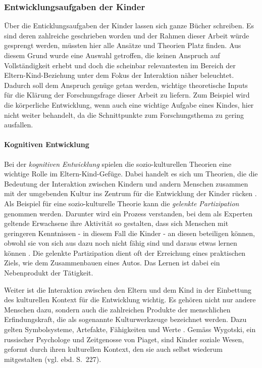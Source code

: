 \subsubsection{Entwicklungsaufgaben der Kinder}\label{sec:Entwicklungsaufgaben} Über die Enticklungsaufgaben der Kinder lassen sich ganze Bücher schreiben. Es sind deren zahlreiche geschrieben worden und der Rahmen dieser Arbeit würde gesprengt werden, müssten hier alle Ansätze und Theorien Platz finden. Aus diesem Grund wurde eine Auswahl getroffen, die keinen Anspruch auf Vollständigkeit erhebt und doch die scheinbar relevantesten im Bereich der Eltern-Kind-Beziehung unter dem Fokus der Interaktion näher beleuchtet. Dadurch soll dem Anspruch genüge getan werden, wichtige theoretische Inputs für die Klärung der Forschungsfrage dieser Arbeit zu liefern. Zum Beispiel wird die körperliche Entwicklung, wenn auch eine wichtige Aufgabe eines Kindes, hier nicht weiter behandelt, da die Schnittpunkte zum Forschungsthema zu gering ausfallen.

\paragraph{Kognitiven Entwicklung}\label{par:KognitiveEntwicklung}
Bei der \textit{kognitiven Entwicklung} spielen die sozio-kulturellen Theorien eine wichtige Rolle im Eltern-Kind-Gefüge. Dabei handelt es sich um Theorien, die die Bedeutung der Interaktion zwischen Kindern und andern Menschen zusammen mit der umgebenden Kultur ins Zentrum für die Entwicklung der Kinder rücken \cite[S.~225ff]{Siegler2008}. Als Beispiel für eine sozio-kulturelle Theorie kann die \textit{gelenkte Partizipation} genommen werden. Darunter wird ein Prozess verstanden, bei dem als Experten geltende Erwachsene ihre Aktivität so gestalten, dass sich Menschen mit geringeren Kenntnissen - in diesem Fall die Kinder - an diesen beteiligen können, obwohl sie von sich aus dazu noch nicht fähig sind und daraus etwas lernen können \cite{Rogoff1990}. Die gelenkte Partizipation dient oft der Erreichung eines praktischen Ziels, wie dem Zusammenbauen eines Autos. Das Lernen ist dabei ein Nebenprodukt der Tätigkeit.

Weiter ist die Interaktion zwischen den Eltern und dem Kind in der Einbettung des kulturellen Kontext für die Entwicklung wichtig. Es gehören nicht nur andere Menschen dazu, sondern auch die zahlreichen Produkte der menschlichen Erfindungskraft, die als sogenannte Kulturwerkzeuge bezeichnet werden. Dazu gelten Symbolsysteme, Artefakte, Fähigkeiten und Werte \cite[S.~226]{Siegler2008}. Gemäss Wygotski, ein russischer Psychologe und Zeitgenosse von Piaget, sind Kinder soziale Wesen, geformt durch ihren kulturellen Kontext, den sie auch selbst wiederum mitgestalten (vgl. ebd. S.~227). 

